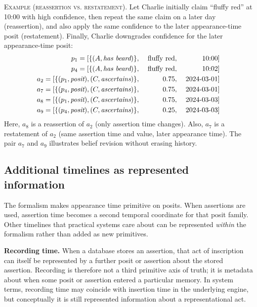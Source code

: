 \documentclass[a4paper,fleqn]{cas-sc}
\begin{document}
\textsc{Example (reassertion vs. restatement).} Let Charlie initially claim ``fluffy red'' at 10:00 with high confidence, then repeat the same claim on a later day (reassertion), and also apply the same confidence to the later appearance-time posit (restatement). Finally, Charlie downgrades confidence for the later appearance-time posit:
\begin{alignat*}{3}
p_{1} = [\{(A, \textit{has beard})\},\;&& \textrm{fluffy red},\;&& \textrm{10:00}]  \\
p_{4} = [\{(A, \textit{has beard})\},\;&& \textrm{fluffy red},\;&& \textrm{10:02}] \\
a_2 = [\{(p_{1}, \textit{posit}), (C, \textit{ascertains})\},\;&& 0.75,\;&& \textrm{2024\text{-}03\text{-}01}] \\
a_7 = [\{(p_{4}, \textit{posit}), (C, \textit{ascertains})\},\;&& 0.75,\;&& \textrm{2024\text{-}03\text{-}01}] \\
a_8 = [\{(p_{1}, \textit{posit}), (C, \textit{ascertains})\},\;&& 0.75,\;&& \textrm{2024\text{-}03\text{-}03}] \\
a_9 = [\{(p_{4}, \textit{posit}), (C, \textit{ascertains})\},\;&& 0.25,\;&& \textrm{2024\text{-}03\text{-}03}]
\end{alignat*}
Here, \(a_8\) is a reassertion of \(a_2\) (only assertion time changes). Also, \(a_7\) is a restatement of \(a_2\) (same assertion time and value, later appearance time). The pair \(a_7\) and \(a_9\) illustrates belief revision without erasing history.

\subsection{Additional timelines as represented information}
The formalism makes appearance time primitive on posits. When assertions are used, assertion time becomes a second temporal coordinate for that posit family. Other timelines that practical systems care about can be represented \emph{within} the formalism rather than added as new primitives.

\textbf{Recording time.} When a database stores an assertion, that act of inscription can itself be represented by a further posit or assertion about the stored assertion. Recording is therefore not a third primitive axis of truth; it is metadata about when some posit or assertion entered a particular memory. In system terms, recording time may coincide with insertion time in the underlying engine, but conceptually it is still represented information about a representational act.
\end{document}
